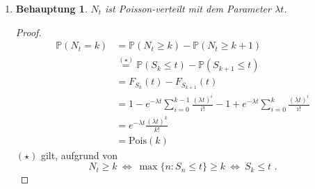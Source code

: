 \documentclass[a4paper]{scrartcl}
\newtheorem*{behaupt}{Behauptung}
\newcommand{\gdw}{\Leftrightarrow}
\newcommand{\prob}{\mathbb{P}}
\def \blattnr {4}
\begin{document}
\begin{enumerate}[label=\bfseries \blattnr.\arabic*]
\begin{enumerate}
            \item
                \begin{behaupt}
                    $N_t$ ist Poisson-verteilt mit dem Parameter $\lambda t$.
                \end{behaupt}
                \begin{proof}
                    \begin{equation*}
                        \begin{split}
                            \prob(N_t = k)
                            &= \prob(N_t \geq k) - \prob(N_t \geq k+1) \\
                            &\overset{(\star)}{=} \prob(S_k \leq t) - \prob(S_{k+1} \leq t) \\
                            &= F_{S_k}(t) - F_{S_{k+1}}(t) \\
                            &= 1 - e^{-\lambda t} \sum_{i=0}^{k-1} \frac{(\lambda t)^i}{i!} - 1 + e^{-\lambda t} \sum_{i=0}^k \frac{(\lambda t)^i}{i!} \\
                            &= e^{-\lambda t} \frac{(\lambda t)^k}{k!} \\
                            &= \text{Pois}(k)
                        \end{split}
                    \end{equation*}
                    $(\star)$ gilt, aufgrund von
                    \begin{equation*}
                        N_t \geq k
                        \ \gdw\  \max \{n : S_n \leq t \} \geq k
                        \ \gdw\  S_k \leq t
                        \text{ .}
                    \end{equation*}
                \end{proof}

        \end{enumerate}
   
\end{enumerate}
\end{document}
